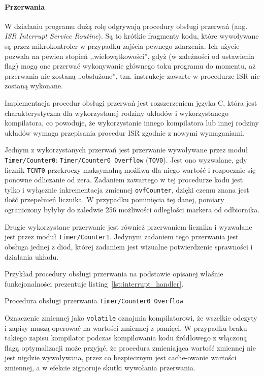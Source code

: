 \paragraph{Przerwania}
W działaniu programu dużą rolę odgrywają procedury obsługi przerwań (ang. \textsl{ISR \ppauza Interrupt Service Routine}). Są to krótkie fragmenty kodu, które wywoływane są przez mikrokontroler w przypadku zajścia pewnego zdarzenia. Ich użycie pozwala na pewien stopień ,,wielowątkowości'', gdyż (w zależności od ustawienia flag) mogą one przerwać wykonywanie głównego toku programu do momentu, aż przerwania nie zostaną ,,obsłużone'', tzn. instrukcje zawarte w procedurze ISR nie zostaną wykonane.

Implementacja procedur obsługi przerwań jest rozszerzeniem języka C, która jest charakterystyczna dla wykorzystanej rodziny układów i wykorzystanego kompilatora, co powoduje, że wykorzystanie innego kompilatora lub innej rodziny układów wymaga przepisania procedur ISR zgodnie z nowymi wymaganiami.

Jednym z wykorzystanych przerwań jest przerwanie wywoływane przez moduł \texttt{Timer/Counter0}: \texttt{Timer/Counter0 Overflow} (\texttt{TOV0}). Jest ono wyzwalane, gdy licznik \texttt{TCNT0} przekroczy maksymalną możliwą dla niego wartość i rozpocznie się ponowne odliczanie od zera. Zadaniem zawartego w tej procedurze kodu jest tylko i wyłącznie inkrementacja zmiennej \texttt{ovfCounter}, dzięki czemu znana jest ilość przepełnień licznika. W przypadku pominięcia tej danej, pomiary ograniczony byłyby do zaledwie 256 możliwości odległości markera od odbiornika.

Drugie wykorzystane przerwanie jest również przerwaniem licznika i wyzwalane jest przez moduł \texttt{Timer/Counter1}. Jedynym zadaniem tego przerwania jest obsługa jednej z diod, której zadaniem jest wizualne potwierdzenie sprawności i działania układu.

Przykład procedury obsługi przerwania na podstawie opisanej właśnie funkcjonalności prezentuje listing~\ref{lst:interrupt_handler}.

\begin{listing}
  
  \caption{Procedura obsługi przerwania \texttt{Timer/Counter0 Overflow}}
  \label{lst:interrupt_handler}
\end{listing}

Oznaczenie zmiennej jako \texttt{volatile} oznajmia kompilatorowi, że wszelkie odczyty i zapisy muszą operować na wartości zmiennej z pamięci. W przypadku braku takiego zapisu kompilator podczas kompilowania kodu źródłowego z włączoną flagą optymalizacji może przyjąć, że procedura zmieniająca wartość zmiennej nie jest nigdzie wywoływana, przez co bezpiecznym jest cache-owanie wartości zmiennej, a w efekcie zignoruje skutki wywołania przerwania.

